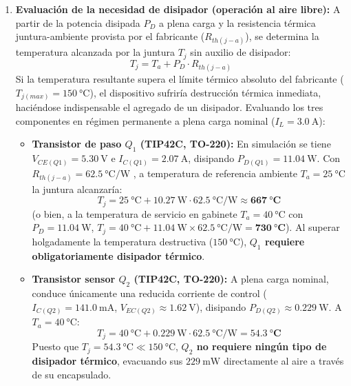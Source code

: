 \begin{enumerate}
    \item \textbf{Evaluación de la necesidad de disipador (operación al aire libre):}  
    A partir de la potencia disipada $P_D$ a plena carga y la resistencia térmica juntura-ambiente provista por
    el fabricante ($R_{th(j-a)}$), se determina la temperatura alcanzada por la juntura $T_j$ sin auxilio de disipador:
    \begin{equation*}
        T_j = T_a + P_D \cdot R_{th(j-a)}
    \end{equation*}
    Si la temperatura resultante supera el límite térmico absoluto del fabricante ($T_{j(max)} = \SI{150}{\celsius}$),
    el dispositivo sufriría destrucción térmica inmediata, haciéndose indispensable el agregado de un disipador.
    Evaluando los tres componentes en régimen permanente a plena carga nominal ($I_L = \SI{3.0}{\ampere}$):
    \begin{itemize}
        \item \textbf{Transistor de paso $Q_1$ (TIP42C, TO-220):} En simulación se tiene $V_{CE(Q1)} = \SI{5.30}{\volt}$
        e $I_{C(Q1)} = \SI{2.07}{\ampere}$, disipando $P_{D(Q1)} = \SI{11.04}{\watt}$. Con $R_{th(j-a)} = \SI{62.5}{\celsius/\watt}$ \cite{onsemi_tip42c},
        a temperatura de referencia ambiente $T_a = \SI{25}{\celsius}$ la juntura alcanzaría:
        \begin{equation*}
            T_j = \SI{25}{\celsius} + \SI{10.27}{\watt} \cdot \SI{62.5}{\celsius/\watt} \approx \mathbf{\SI{667}{\celsius}}
        \end{equation*}
        (o bien, a la temperatura de servicio en gabinete $T_a = \SI{40}{\celsius}$ con $P_D = \SI{11.04}{\watt}$,
        $T_j = \SI{40}{\celsius} + \SI{11.04}{\watt} \times \SI{62.5}{\celsius/\watt} = \mathbf{\SI{730}{\celsius}}$).
        Al superar holgadamente la temperatura destructiva ($\SI{150}{\celsius}$), \textbf{$Q_1$ requiere obligatoriamente disipador térmico}.
        
        \item \textbf{Transistor sensor $Q_2$ (TIP42C, TO-220):} A plena carga nominal, conduce únicamente una reducida corriente
        de control ($I_{C(Q2)} = \SI{141.0}{\milli\ampere}$, $V_{EC(Q2)} \approx \SI{1.62}{\volt}$), disipando
        $P_{D(Q2)} \approx \SI{0.229}{\watt}$. A $T_a = \SI{40}{\celsius}$:
        \begin{equation*}
            T_j = \SI{40}{\celsius} + \SI{0.229}{\watt} \cdot \SI{62.5}{\celsius/\watt} = \mathbf{\SI{54.3}{\celsius}}
        \end{equation*}
        Puesto que $T_j = \SI{54.3}{\celsius} \ll \SI{150}{\celsius}$, \textbf{$Q_2$ no requiere ningún tipo de disipador térmico},
        evacuando sus $\SI{229}{\milli\watt}$ directamente al aire a través de su encapsulado.
        

\end{itemize}
\end{enumerate}
